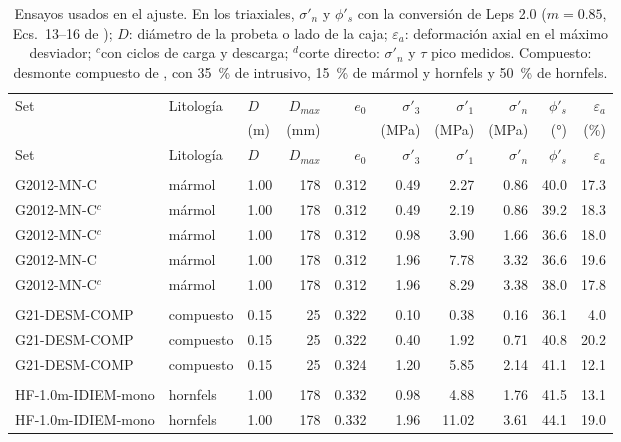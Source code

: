 \documentclass[11pt,letterpaper]{article}
\begin{document}
\begin{footnotesize}\setlength{\tabcolsep}{2.5pt}
\begin{longtable}{lllrrrrrrr}
\caption{Ensayos usados en el ajuste. En los triaxiales, $\sigma'_n$ y $\phi'_s$ con la conversión de Leps 2.0 ($m = 0.85$, Ecs.~13--16 de \citealp{cylwik}); $D$: diámetro de la probeta o lado de la caja; $\varepsilon_a$: deformación axial en el máximo desviador; $^{c}$con ciclos de carga y descarga; $^{d}$corte directo: $\sigma'_n$ y $\tau$ pico medidos. Compuesto: desmonte compuesto de \citet{g2021}, con 35~\% de intrusivo, 15~\% de mármol y hornfels y 50~\% de hornfels.}\label{tab:datos}\\
\toprule Set & Litología & $D$ & $D_{max}$ & $e_0$ & $\sigma'_3$ & $\sigma'_1$ & $\sigma'_n$ & $\phi'_s$ & $\varepsilon_a$\\
 & & (m) & (mm) & & (MPa) & (MPa) & (MPa) & (°) & (\%)\\\midrule\endfirsthead
\toprule Set & Litología & $D$ & $D_{max}$ & $e_0$ & $\sigma'_3$ & $\sigma'_1$ & $\sigma'_n$ & $\phi'_s$ & $\varepsilon_a$\\\midrule\endhead
\multicolumn{10}{l}{\textit{\citet{g2012}}} \\
G2012-MN-C & mármol & 1.00 & 178 & 0.312 & 0.49 & 2.27 & 0.86 & 40.0 & 17.3 \\
G2012-MN-C$^{c}$ & mármol & 1.00 & 178 & 0.312 & 0.49 & 2.19 & 0.86 & 39.2 & 18.3 \\
G2012-MN-C$^{c}$ & mármol & 1.00 & 178 & 0.312 & 0.98 & 3.90 & 1.66 & 36.6 & 18.0 \\
G2012-MN-C & mármol & 1.00 & 178 & 0.312 & 1.96 & 7.78 & 3.32 & 36.6 & 19.6 \\
G2012-MN-C$^{c}$ & mármol & 1.00 & 178 & 0.312 & 1.96 & 8.29 & 3.38 & 38.0 & 17.8 \\
\midrule \multicolumn{10}{l}{\textit{\citet{g2021}}} \\
G21-DESM-COMP & compuesto & 0.15 & 25 & 0.322 & 0.10 & 0.38 & 0.16 & 36.1 & 4.0 \\
G21-DESM-COMP & compuesto & 0.15 & 25 & 0.322 & 0.40 & 1.92 & 0.71 & 40.8 & 20.2 \\
G21-DESM-COMP & compuesto & 0.15 & 25 & 0.324 & 1.20 & 5.85 & 2.14 & 41.1 & 12.1 \\
\midrule \multicolumn{10}{l}{\textit{\citet{w2022}}} \\
HF-1.0m-IDIEM-mono & hornfels & 1.00 & 178 & 0.332 & 0.98 & 4.88 & 1.76 & 41.5 & 13.1 \\
HF-1.0m-IDIEM-mono & hornfels & 1.00 & 178 & 0.332 & 1.96 & 11.02 & 3.61 & 44.1 & 19.0 \\

\end{longtable}
\end{footnotesize}
\end{document}
